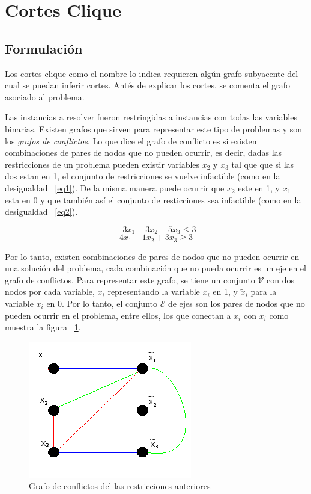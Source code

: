 \section{Cortes Clique}

\bigskip
\subsection{Formulaci\'on}
\label{formulacion}

Los cortes clique como el nombre lo indica requieren alg\'un grafo subyacente del cual se puedan inferir cortes.
Ant\'es de explicar los cortes, se comenta el grafo asociado al problema.

Las instancias a resolver fueron restringidas a instancias con todas las variables binarias.
Existen grafos que sirven para representar este tipo de problemas y son los \emph{grafos de conflictos}.
Lo que dice el grafo de conflicto es si existen combinaciones de pares de nodos que no pueden ocurrir, es decir,
dadas las restricciones de un problema pueden existir variables $x_2$ y $x_3$ tal que que si las dos estan en 1,
el conjunto de restricciones se vuelve infactible (como en la desigualdad ~\ref{eq1}). De la misma manera puede ocurrir que $x_2$ este en 1, y $x_1$ esta en 0 y que tambi\'en
as\'i el conjunto de resticciones sea infactible (como en la desigualdad ~\ref{eq2}).

\begin{equation} \label{eq1}
-3 x_1 + 3 x_2 + 5 x_3 \leq 3
\end{equation}
\begin{equation} \label{eq2}
4 x_1 - 1 x_2 + 3 x_3 \geq 3
\end{equation}

Por lo tanto, existen combinaciones de pares de nodos que no pueden ocurrir en una soluci\'on del problema, cada combinaci\'on que no pueda ocurrir
es un eje en el grafo de conflictos. Para representar este grafo, se tiene un conjunto $\mathcal{V}$ con dos nodos por cada variable, $x_i$
representando la variable $x_i$ en 1, y $\tilde{x}_i$ para la variable $x_i$ en 0. Por lo tanto, el conjunto $\mathcal{E}$ de ejes son los pares de 
nodos que no pueden ocurrir en el problema, entre ellos, los que conectan a $x_i$ con $\tilde{x}_i$ como muestra la figura ~\ref{fig1}.


\begin{figure}[H]
\begin{center}
\includegraphics{grafoconflicto}
\end{center}
\caption{Grafo de conflictos del las restricciones anteriores}
\label{fig1}
\end{figure}

